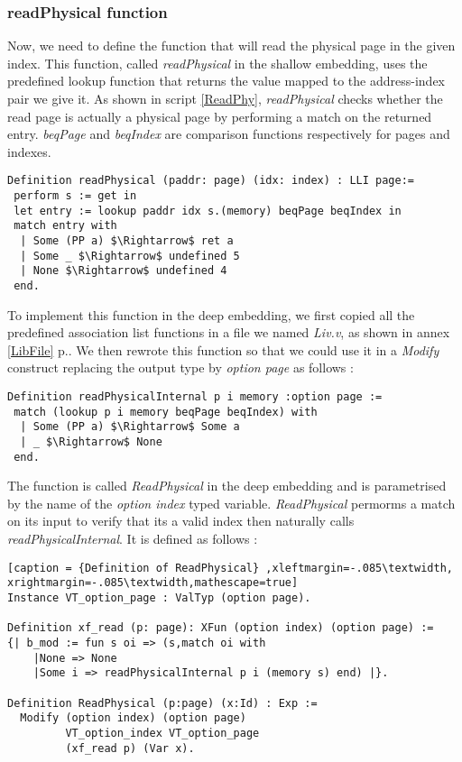 \subsubsection{readPhysical function} 
Now, we need to define the function that will read the physical page in the given index. This function, called \textit{readPhysical} in the shallow embedding,  uses the predefined lookup function that returns the value mapped to the address-index pair we give it. As shown in script \ref{ReadPhy}, \textit{readPhysical} checks whether the read page is actually a physical page by performing a match on the returned entry. \textit{beqPage} and \textit{beqIndex} are comparison functions respectively for pages and indexes. 
\begin{lstlisting}[caption = {readPhysical function in the shallow embedding},xleftmargin=-.06\textwidth,
xrightmargin=-.06\textwidth ,label={ReadPhy},mathescape=true]
Definition readPhysical (paddr: page) (idx: index) : LLI page:=
 perform s := get in
 let entry := lookup paddr idx s.(memory) beqPage beqIndex in
 match entry with
  | Some (PP a) $\Rightarrow$ ret a
  | Some _ $\Rightarrow$ undefined 5
  | None $\Rightarrow$ undefined 4
 end.
\end{lstlisting} \pagebreak
To implement this function in the deep embedding, we first copied all the predefined association list functions in a file we named \textit{Liv.v}, as shown in annex \ref{LibFile} p.\pageref{LibFile}. We then rewrote this function so that we could use it in a \textit{Modify} construct replacing the output type by \textit{option page} as follows :
\begin{lstlisting}[caption = {Rewritten shallow readPhysical function},xleftmargin=-.02\textwidth,
xrightmargin=-.02\textwidth,mathescape=true]
Definition readPhysicalInternal p i memory :option page := 
 match (lookup p i memory beqPage beqIndex) with
  | Some (PP a) $\Rightarrow$ Some a
  | _ $\Rightarrow$ None
 end.
\end{lstlisting} \vspace{4pt}
The function is called \textit{ReadPhysical} in the deep embedding and is parametrised by the name of the \textit{option index} typed variable. \textit{ReadPhysical} permorms a match on its input to verify that its a valid index then naturally calls \textit{readPhysicalInternal}. It is defined as follows : 
\begin{lstlisting}[caption = {Definition of ReadPhysical} ,xleftmargin=-.085\textwidth,
xrightmargin=-.085\textwidth,mathescape=true]
Instance VT_option_page : ValTyp (option page).

Definition xf_read (p: page): XFun (option index) (option page) := 
{| b_mod := fun s oi => (s,match oi with 
   	|None => None 
   	|Some i => readPhysicalInternal p i (memory s) end) |}.

Definition ReadPhysical (p:page) (x:Id) : Exp :=
  Modify (option index) (option page) 
         VT_option_index VT_option_page 
         (xf_read p) (Var x).
\end{lstlisting} \vspace{4pt}

